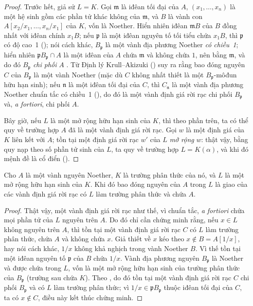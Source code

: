 \documentclass[oneside,10pt]{amsart}
\let\EGAOriginalLabel\label
\renewcommand{\label}[1]{\phantomsection\EGAOriginalLabel{#1}}
\begin{document}
\begin{proof}
Trước hết, giả sử $L=K$.
Gọi $\mathfrak{m}$ là iđêan tối đại của $A$, $(x_1,\ldots,x_n)$ là một hệ sinh gồm các phần tử khác không của $\mathfrak{m}$, và $B$ là vành con $A[x_2/x_1,\ldots,x_n/x_1]$ của $K$, vốn là Noether.
Hiển nhiên iđêan $\mathfrak{m}B$ của $B$ đồng nhất với iđêan chính $x_1B$;
nếu $\mathfrak{p}$ là một iđêan nguyên tố tối tiểu chứa $x_1B$, thì $\mathfrak{p}$ có độ cao~1 (\cite[t.~I, p.~277]{I-13});
nói cách khác, $B_\mathfrak{p}$ là một vành địa phương Noether \emph{có chiều~1};
hiển nhiên $\mathfrak{p}B_\mathfrak{p}\cap A$ là một iđêan của $A$ chứa $\mathfrak{m}$ và không chứa $1$, nên bằng $\mathfrak{m}$, và do đó $B_\mathfrak{p}$ \emph{chi phối} $A$ .
Từ Định lý Krull--Akizuki (\cite[p.~293]{II-25}) suy ra rằng bao đóng nguyên $C$ của $B_\mathfrak{p}$ là một vành Noether (mặc dù $C$ không nhất thiết là một $B_\mathfrak{p}$-môđun hữu hạn sinh);
nếu $\mathfrak{n}$ là một iđêan tối đại của $C$, thì $C_\mathfrak{n}$ là một vành địa phương Noether chuẩn tắc có chiều~1 (\cite[p.~295]{II-25}), do đó là một vành định giá rời rạc chi phối $B_\mathfrak{p}$ và, \emph{a fortiori}, chi phối $A$.

Bây giờ, nếu $L$ là một mở rộng hữu hạn sinh của $K$, thì theo phần trên, ta có thể quy về trường hợp $A$ đã là một vành định giá rời rạc.
Gọi $w$ là một định giá của $K$ liên kết với $A$;
tồn tại một định giá rời rạc $w'$ của $L$ \emph{mở rộng} $w$: thật vậy, bằng quy nạp theo số phần tử sinh của $L$, ta quy về trường hợp $L=K(\alpha)$, và khi đó mệnh đề là cổ điển (\cite[p.~106]{II-24}).
\end{proof}

\begin{corollary}[7.1.8]
\label{II.7.1.8}
Cho $A$ là một vành nguyên Noether, $K$ là trường phân thức của nó, và $L$ là một mở rộng hữu hạn sinh của $K$.
Khi đó bao đóng nguyên của $A$ trong $L$ là giao của các vành định giá rời rạc có $L$ làm trường phân thức và chứa $A$.
\end{corollary}

\begin{proof}
Thật vậy, một vành định giá rời rạc như thế, vì chuẩn tắc, \emph{a fortiori} chứa mọi phần tử của $L$ nguyên trên $A$.
Do đó chỉ cần chứng minh rằng, nếu $x\in L$ không nguyên trên $A$, thì tồn tại một vành định giá rời rạc $C$ có $L$ làm trường phân thức, chứa $A$ và không chứa $x$.
Giả thiết về $x$ kéo theo $x\not\in B=A[1/x]$, hay nói cách khác, $1/x$ không khả nghịch trong vành Noether $B$.
Vì thế tồn tại một iđêan nguyên tố $\mathfrak{p}$ của $B$ chứa $1/x$.
Vành địa phương nguyên $B_\mathfrak{p}$ là Noether và được chứa trong $L$, vốn là một mở rộng hữu hạn sinh của trường phân thức của $B_\mathfrak{p}$ (trường sau chứa $K$).
Theo , do đó tồn tại một vành định giá rời rạc $C$ chi phối $B_\mathfrak{p}$ và có $L$ làm trường phân thức;
vì $1/x\in\mathfrak{p}B_\mathfrak{p}$ thuộc iđêan tối đại của $C$, ta có $x\not\in C$, điều này kết thúc chứng minh.
\end{proof}
\end{document}
